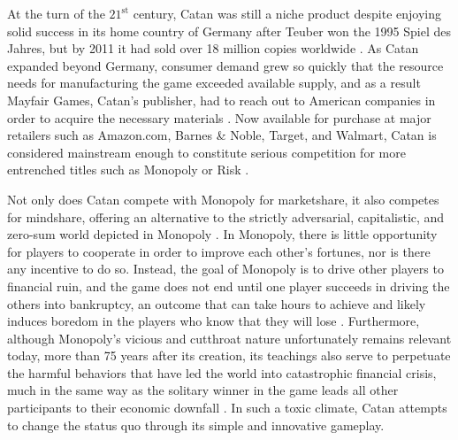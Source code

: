 \documentclass[pageno]{jpaper}
\begin{document}
\begin{doublespacing}
At the turn of the $21^{\text{st}}$ century, Catan was still a niche product despite enjoying solid success in its home country of Germany after Teuber won the 1995 Spiel des Jahres, but by 2011 it had sold over 18 million copies worldwide \cite{raphel2014,wingrove2011}. As Catan expanded beyond Germany, consumer demand grew so quickly that the resource needs for manufacturing the game exceeded available supply, and as a result Mayfair Games, Catan's publisher, had to reach out to American companies in order to acquire the necessary materials \cite{raphel2014}. Now available for purchase at major retailers such as Amazon.com, Barnes \& Noble, Target, and Walmart, Catan is considered mainstream enough to constitute serious competition for more entrenched titles such as Monopoly or Risk \cite{eskin2010,law2010,raphel2014,wingrove2011}. 

Not only does Catan compete with Monopoly for marketshare, it also competes for mindshare, offering an alternative to the strictly adversarial, capitalistic, and zero-sum world depicted in Monopoly \cite{eskin2010,wingrove2011}. In Monopoly, there is little opportunity for players to cooperate in order to improve each other's fortunes, nor is there any incentive to do so. Instead, the goal of Monopoly is to drive other players to financial ruin, and the game does not end until one player succeeds in driving the others into bankruptcy, an outcome that can take hours to achieve and likely induces boredom in the players who know that they will lose \cite{eskin2010}. Furthermore, although Monopoly's vicious and cutthroat nature unfortunately remains relevant today, more than 75 years after its creation, its teachings also serve to perpetuate the harmful behaviors that have led the world into catastrophic financial crisis, much in the same way as the solitary winner in the game leads all other participants to their economic downfall \cite{eskin2010}. In such a toxic climate, Catan attempts to change the status quo through its simple and innovative gameplay.


\end{doublespacing}
\end{document}
